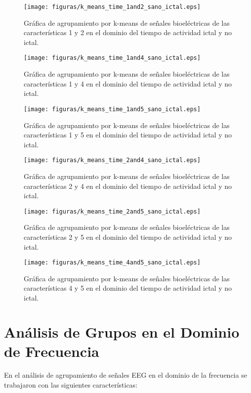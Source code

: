 \begin{figure}[H]
    \centering
    \texttt{[image: figuras/k\_means\_time\_1and2\_sano\_ictal.eps]}
    \caption{Gráfica de agrupamiento por k-means de señales bioeléctricas de las características 1 y 2 en el dominio del tiempo  de actividad ictal y no ictal.}
    \label{fig: k_means_Time_1_2}
\end{figure}
\begin{figure}[H]
    \centering
    \texttt{[image: figuras/k\_means\_time\_1and4\_sano\_ictal.eps]}
    \caption{Gráfica de agrupamiento por k-means de señales bioeléctricas de las características 1 y 4 en el dominio del tiempo de actividad ictal y no ictal.}
    \label{fig: k_means_time_1_4}
\end{figure}
\begin{figure}[H]
    \centering
    \texttt{[image: figuras/k\_means\_time\_1and5\_sano\_ictal.eps]}
    \caption{Gráfica de agrupamiento por k-means de señales bioeléctricas de las características 1 y 5 en el dominio del tiempo de actividad ictal y no ictal.}
    \label{fig: k_means_time_1_5}
\end{figure}
\begin{figure}[H]
    \centering
    \texttt{[image: figuras/k\_means\_time\_2and4\_sano\_ictal.eps]}
    \caption{Gráfica de agrupamiento por k-means de señales bioeléctricas de las características 2 y 4 en el dominio del tiempo de actividad ictal y no ictal.}
    \label{fig: k_means_time_2_4}
\end{figure}
\begin{figure}[H]
    \centering
    \texttt{[image: figuras/k\_means\_time\_2and5\_sano\_ictal.eps]}
    \caption{Gráfica de agrupamiento por k-means de señales bioeléctricas de las características 2 y 5 en el dominio del tiempo de actividad ictal y no ictal.}
    \label{fig: k_means_time_2_5}
\end{figure}
\begin{figure}[H]
    \centering
    \texttt{[image: figuras/k\_means\_time\_4and5\_sano\_ictal.eps]}
    \caption{Gráfica de agrupamiento por k-means de señales bioeléctricas de las características 4 y 5 en el dominio del tiempo de actividad ictal y no ictal.}
    \label{fig: k_means_time_4_5}
\end{figure}


\section{Análisis de Grupos en el Dominio de Frecuencia}
En el análisis de agrupamiento de señales EEG en el dominio de la frecuencia se trabajaron con las siguientes características:

